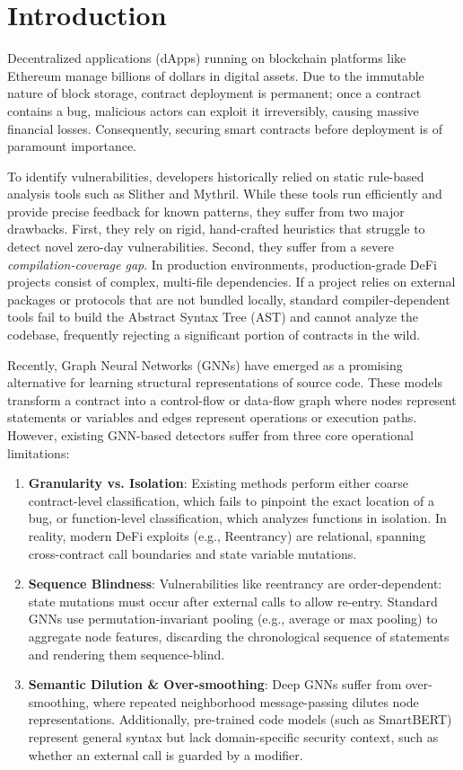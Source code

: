 \documentclass[conference]{IEEEtran}
\begin{document}
\section{Introduction}
Decentralized applications (dApps) running on blockchain platforms like Ethereum manage billions of dollars in digital assets. Due to the immutable nature of block storage, contract deployment is permanent; once a contract contains a bug, malicious actors can exploit it irreversibly, causing massive financial losses. Consequently, securing smart contracts before deployment is of paramount importance.

To identify vulnerabilities, developers historically relied on static rule-based analysis tools such as Slither and Mythril. While these tools run efficiently and provide precise feedback for known patterns, they suffer from two major drawbacks. First, they rely on rigid, hand-crafted heuristics that struggle to detect novel zero-day vulnerabilities. Second, they suffer from a severe \textit{compilation-coverage gap}. In production environments, production-grade DeFi projects consist of complex, multi-file dependencies. If a project relies on external packages or protocols that are not bundled locally, standard compiler-dependent tools fail to build the Abstract Syntax Tree (AST) and cannot analyze the codebase, frequently rejecting a significant portion of contracts in the wild.

Recently, Graph Neural Networks (GNNs) have emerged as a promising alternative for learning structural representations of source code. These models transform a contract into a control-flow or data-flow graph where nodes represent statements or variables and edges represent operations or execution paths. However, existing GNN-based detectors suffer from three core operational limitations:
\begin{enumerate}
    \item \textbf{Granularity vs. Isolation}: Existing methods perform either coarse contract-level classification, which fails to pinpoint the exact location of a bug, or function-level classification, which analyzes functions in isolation. In reality, modern DeFi exploits (e.g., Reentrancy) are relational, spanning cross-contract call boundaries and state variable mutations.
    \item \textbf{Sequence Blindness}: Vulnerabilities like reentrancy are order-dependent: state mutations must occur after external calls to allow re-entry. Standard GNNs use permutation-invariant pooling (e.g., average or max pooling) to aggregate node features, discarding the chronological sequence of statements and rendering them sequence-blind.
    \item \textbf{Semantic Dilution \& Over-smoothing}: Deep GNNs suffer from over-smoothing, where repeated neighborhood message-passing dilutes node representations. Additionally, pre-trained code models (such as SmartBERT) represent general syntax but lack domain-specific security context, such as whether an external call is guarded by a modifier.
\end{enumerate}
\end{document}
